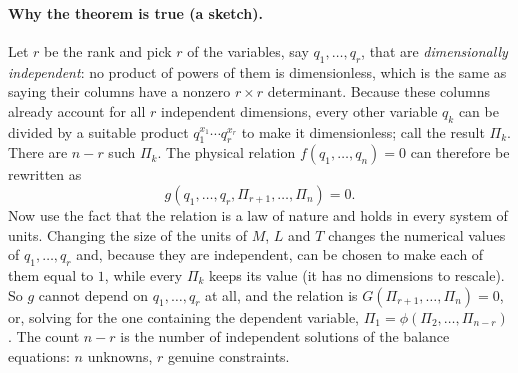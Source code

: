 \paragraph{Why the theorem is true (a sketch).} Let $r$ be the rank and pick $r$ of the variables, say $q_1, \dots, q_r$, that are \emph{dimensionally independent}: no product of powers of them is dimensionless, which is the same as saying their columns have a nonzero $r \times r$ determinant. Because these columns already account for all $r$ independent dimensions, every other variable $q_k$ can be divided by a suitable product $q_1^{x_1}\cdots q_r^{x_r}$ to make it dimensionless; call the result $\Pi_k$. There are $n - r$ such $\Pi_k$. The physical relation $f(q_1, \dots, q_n) = 0$ can therefore be rewritten as
\[
g(q_1, \dots, q_r, \Pi_{r+1}, \dots, \Pi_n) = 0 .
\]
Now use the fact that the relation is a law of nature and holds in every system of units. Changing the size of the units of $M$, $L$ and $T$ changes the numerical values of $q_1, \dots, q_r$ and, because they are independent, can be chosen to make each of them equal to $1$, while every $\Pi_k$ keeps its value (it has no dimensions to rescale). So $g$ cannot depend on $q_1, \dots, q_r$ at all, and the relation is $G(\Pi_{r+1}, \dots, \Pi_n) = 0$, or, solving for the one containing the dependent variable, $\Pi_1 = \phi(\Pi_2, \dots, \Pi_{n-r})$. The count $n - r$ is the number of independent solutions of the balance equations: $n$ unknowns, $r$ genuine constraints.

